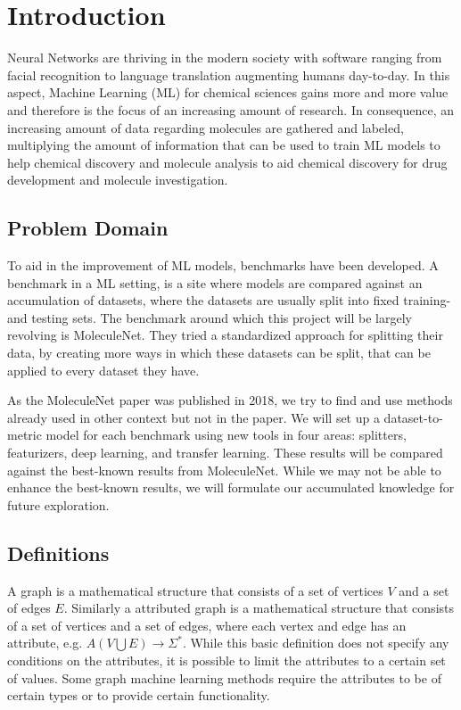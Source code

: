 \section{Introduction}

Neural Networks are thriving in the modern society with software ranging from facial recognition to language translation augmenting humans day-to-day.
In this aspect, Machine Learning (ML) for chemical sciences gains more and more value and therefore is the focus of an increasing amount of research.
In consequence, an increasing amount of data regarding molecules are gathered and labeled, multiplying the amount of information that can be used to train ML models to help chemical discovery and molecule analysis to aid chemical discovery for drug development and molecule investigation.

\subsection{Problem Domain}

To aid in the improvement of ML models, benchmarks have been developed.
A benchmark in a ML setting, is a site where models are compared against an accumulation of datasets, where the datasets are usually split into fixed training- and testing sets.
The benchmark around which this project will be largely revolving is MoleculeNet.
They tried a standardized approach for splitting their data, by creating more ways in which these datasets can be split, that can be applied to every dataset they have.

As the MoleculeNet paper was published in 2018, we try to find and use methods already used in other context but not in the paper.
We will set up a dataset-to-metric model for each benchmark using new tools in four areas: splitters, featurizers, deep learning, and transfer learning.
These results will be compared against the best-known results from MoleculeNet. While we may not be able to enhance the best-known results, we will formulate our accumulated knowledge for future exploration.

\subsection{Definitions}

A graph is a mathematical structure that consists of a set of vertices $V$ and a set of edges $E$.
Similarly a attributed graph is a mathematical structure that consists of a set of vertices and a set of edges, where each vertex and edge has an attribute, e.g. $A(V \bigcup E) \to \Sigma^*$.
While this basic definition does not specify any conditions on the attributes, it is possible to limit the attributes to a certain set of values.
Some graph machine learning methods require the attributes to be of certain types or to provide certain functionality.

